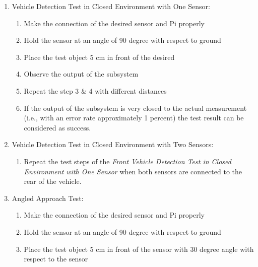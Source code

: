 \documentclass[a4paper,12pt]{article}
\begin{document}
\begin{enumerate}
	\item Vehicle Detection Test in Closed Environment with One Sensor:
	
	\begin{enumerate}
		\item Make the connection of the desired sensor and Pi properly  
		\item Hold the sensor at an angle of 90 degree with respect to ground  
		\item Place the test object 5 cm in front of the desired  
		
		\item Observe the output of the subsystem  
		
		\item Repeat the step 3 \& 4 with different distances  
		
		\item If the output of the subsystem is very closed to the actual measurement (i.e., with an error rate approximately 1 percent) the test result can be considered as success.
		
	\end{enumerate}					
	
	
	\item Vehicle Detection Test in Closed Environment with Two Sensors:		
	
	\begin{enumerate}
		
		\item Repeat the test steps of the \textit{Front Vehicle Detection Test in Closed Environment with One Sensor} when both sensors are connected to the rear of the vehicle.   
		
	\end{enumerate}
	
	
	\item {Angled Approach Test:}
	
	\begin{enumerate}
		
		\item Make the connection of the desired sensor and Pi properly  
		
		\item Hold the sensor at an angle of 90 degree with respect to ground  
		
		\item Place the test object 5 cm in front of the sensor with 30 degree angle with respect to the sensor  
		

\end{enumerate}
\end{enumerate}
\end{document}
